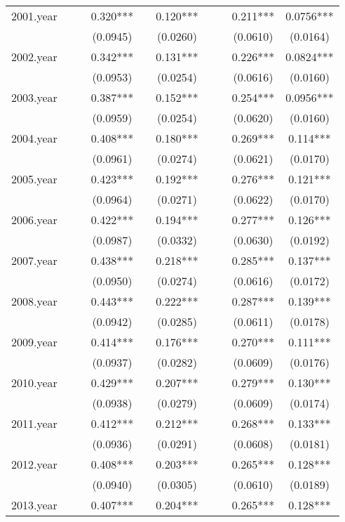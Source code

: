 \documentclass[]{article}
\begin{document}
\begin{tabular}{lccccccccc}
2001.year &  &  & 0.320*** &  & 0.120*** &  &  & 0.211*** & 0.0756*** \\
 &  &  & (0.0945) &  & (0.0260) &  &  & (0.0610) & (0.0164) \\
2002.year &  &  & 0.342*** &  & 0.131*** &  &  & 0.226*** & 0.0824*** \\
 &  &  & (0.0953) &  & (0.0254) &  &  & (0.0616) & (0.0160) \\
2003.year &  &  & 0.387*** &  & 0.152*** &  &  & 0.254*** & 0.0956*** \\
 &  &  & (0.0959) &  & (0.0254) &  &  & (0.0620) & (0.0160) \\
2004.year &  &  & 0.408*** &  & 0.180*** &  &  & 0.269*** & 0.114*** \\
 &  &  & (0.0961) &  & (0.0274) &  &  & (0.0621) & (0.0170) \\
2005.year &  &  & 0.423*** &  & 0.192*** &  &  & 0.276*** & 0.121*** \\
 &  &  & (0.0964) &  & (0.0271) &  &  & (0.0622) & (0.0170) \\
2006.year &  &  & 0.422*** &  & 0.194*** &  &  & 0.277*** & 0.126*** \\
 &  &  & (0.0987) &  & (0.0332) &  &  & (0.0630) & (0.0192) \\
2007.year &  &  & 0.438*** &  & 0.218*** &  &  & 0.285*** & 0.137*** \\
 &  &  & (0.0950) &  & (0.0274) &  &  & (0.0616) & (0.0172) \\
2008.year &  &  & 0.443*** &  & 0.222*** &  &  & 0.287*** & 0.139*** \\
 &  &  & (0.0942) &  & (0.0285) &  &  & (0.0611) & (0.0178) \\
2009.year &  &  & 0.414*** &  & 0.176*** &  &  & 0.270*** & 0.111*** \\
 &  &  & (0.0937) &  & (0.0282) &  &  & (0.0609) & (0.0176) \\
2010.year &  &  & 0.429*** &  & 0.207*** &  &  & 0.279*** & 0.130*** \\
 &  &  & (0.0938) &  & (0.0279) &  &  & (0.0609) & (0.0174) \\
2011.year &  &  & 0.412*** &  & 0.212*** &  &  & 0.268*** & 0.133*** \\
 &  &  & (0.0936) &  & (0.0291) &  &  & (0.0608) & (0.0181) \\
2012.year &  &  & 0.408*** &  & 0.203*** &  &  & 0.265*** & 0.128*** \\
 &  &  & (0.0940) &  & (0.0305) &  &  & (0.0610) & (0.0189) \\
2013.year &  &  & 0.407*** &  & 0.204*** &  &  & 0.265*** & 0.128*** \\

\end{tabular}
\end{document}
